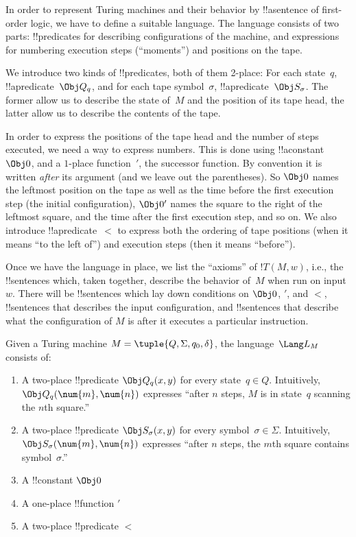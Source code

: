 \documentclass[../../../include/open-logic-section]{subfiles}
\begin{document}

\begin{explain}
In order to represent Turing machines and their behavior by !!a{sentence}
of first-order logic, we have to define a suitable language. The
language consists of two parts: !!{predicate}s for describing
configurations of the machine, and expressions for numbering execution
steps (``moments'') and positions on the tape.

We introduce two kinds of !!{predicate}s, both of them 2-place: For
each state~$q$, !!a{predicate}~$\Obj Q_q$, and for each tape
symbol~$\sigma$, !!a{predicate}~$\Obj S_\sigma$. The former allow us
to describe the state of~$M$ and the position of its tape head, the
latter allow us to describe the contents of the tape.  

In order to express the positions of the tape head and the number of
steps executed, we need a way to express numbers. This is done using
!!a{constant}~$\Obj 0$, and a $1$-place function~$\prime$, the
successor function. By convention it is written \emph{after} its
argument (and we leave out the parentheses). So $\Obj 0$ names the
leftmost position on the tape as well as the time before the first
execution step (the initial configuration), $\Obj 0'$ names the square
to the right of the leftmost square, and the time after the first
execution step, and so on. We also introduce !!a{predicate}~$<$ to
express both the ordering of tape positions (when it means ``to the
left of'') and execution steps (then it means ``before'').

Once we have the language in place, we list the ``axioms'' of $!T(M,
w)$, i.e., the !!{sentence}s which, taken together, describe the
behavior of~$M$ when run on input~$w$.  There will be !!{sentence}s
which lay down conditions on $\Obj 0$, $\prime$, and $<$,
!!{sentence}s that describes the input configuration, and
!!{sentence}s that describe what the configuration of $M$ is after it
executes a particular instruction.
\end{explain}

\begin{defn}
Given a Turing machine $M = \tuple{Q, \Sigma, q_0, \delta}$, the
language~$\Lang L_M$ consists of:
\begin{enumerate}
\item A two-place !!{predicate} $\Obj Q_q(x, y)$ for every state~$q \in
  Q$.  Intuitively, $\Obj Q_q(\num{m}, \num{n})$ expresses ``after $n$
  steps, $M$ is in state~$q$ scanning the $n$th square.''
\item A two-place !!{predicate} $\Obj S_\sigma(x, y)$ for every
  symbol~$\sigma\in \Sigma$.  Intuitively, $\Obj S_\sigma(\num{m},
  \num{n})$ expresses ``after $n$ steps, the $m$th square contains
  symbol~$\sigma$.''
\item A !!{constant} $\Obj 0$
\item A one-place !!{function} $\prime$
\item A two-place !!{predicate} $<$
\end{enumerate}
\end{defn}
\end{document}
